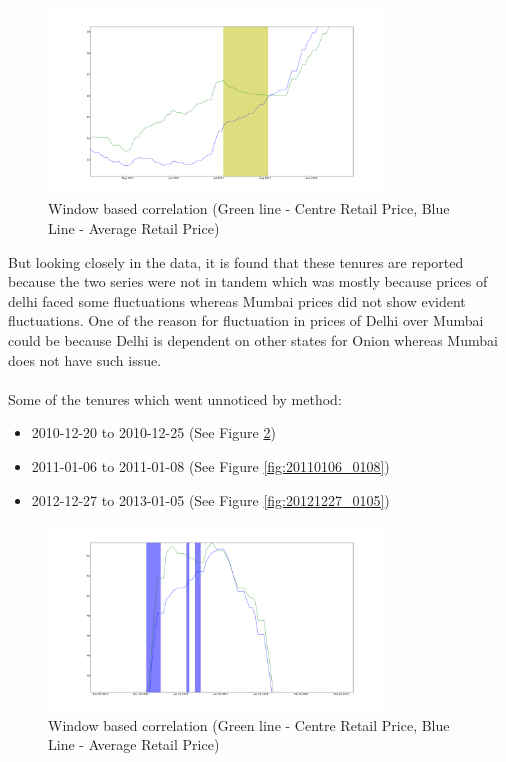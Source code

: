 \documentclass[a4paper,10pt]{report}
\begin{document}
\begin{itemize}
			\begin{figure}[H]
		    	\centering
  		    	\includegraphics[width=0.8\textwidth]{graphs/20110704_0802.png}
		    	\caption{Window based correlation (Green line - Centre Retail Price, Blue Line - Average Retail Price)}
		    	\label{fig:20110704_0802}
			\end{figure}
			
			But looking closely in the data, it is found that these tenures are reported because the two series were not in tandem which was mostly because prices of delhi faced some fluctuations whereas Mumbai prices did not show evident fluctuations. One of the reason for fluctuation in prices of Delhi over Mumbai could be because Delhi is dependent on other states for Onion whereas Mumbai does not have such issue.
			\\
			\\
			Some of the tenures which went unnoticed by method:
			
			\begin{itemize}
				\item 2010-12-20 to 2010-12-25 (See Figure \ref{fig:20101220_1225})
				\item 2011-01-06 to 2011-01-08 (See Figure \ref{fig:20110106_0108})
				\item 2012-12-27 to 2013-01-05 (See Figure \ref{fig:20121227_0105})
			\end{itemize}
			\begin{figure}[H]
		    	\centering
  		    	\includegraphics[width=0.8\textwidth]{graphs/20101220_1225.png}
		    	\caption{Window based correlation (Green line - Centre Retail Price, Blue Line - Average Retail Price)}
		    	\label{fig:20101220_1225}
			\end{figure}
			

\end{itemize}
\end{document}
